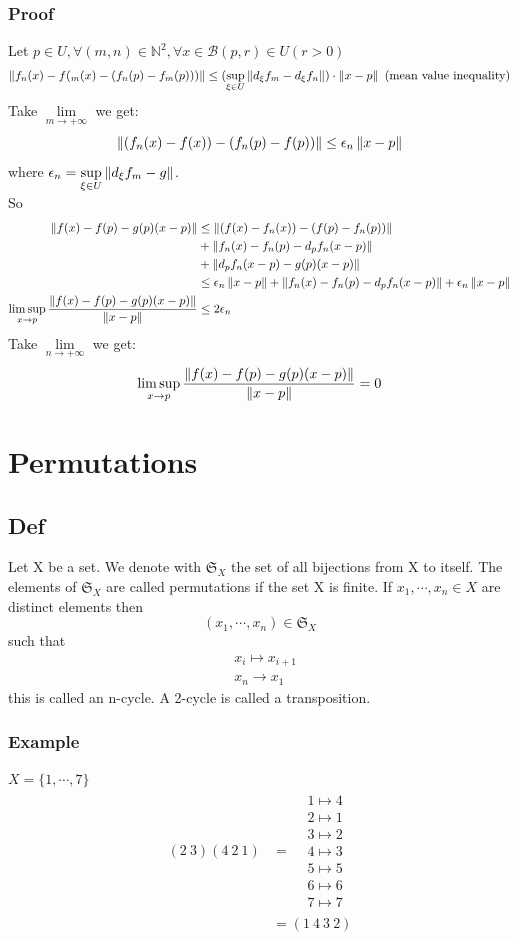 \documentclass{book}
\begin{document}
\subsection*{Proof}
Let $p\in U,\forall(m,n)\in \mathbb{N}^2,\forall x\in \mathcal{B}(p,r)\in U(r>0)$
$$\begin{aligned}
    \left\lVert f_n(x)-f(_m(x)-(f_n(p)-f_m(p))) \right\rVert\leq (\sup\limits_{\xi\in U}\left\lVert d_\xi f_m-d_\xi f_n \right\rVert)\cdot\left\lVert x-p \right\rVert\ (\text{mean value inequality})
\end{aligned}$$
Take $\lim\limits_{m\rightarrow+\infty}$ we get:
$$\left\lVert (f_n(x)-f(x))-(f_n(p)-f(p)) \right\rVert\leq\epsilon_n\left\lVert x-p \right\rVert$$
where $\epsilon_n=\sup\limits_{\xi\in U}\left\lVert d_\xi f_m-g \right\rVert$.\\
So $$\begin{aligned}
    \left\lVert f(x)-f(p)-g(p)(x-p) \right\rVert &\leq\left\lVert (f(x)-f_n(x))-(f(p)-f_n(p)) \right\rVert\\ &+\left\lVert f_n(x)-f_n(p)-d_pf_n(x-p) \right\rVert\\ & +\left\lVert d_p f_n(x-p)-g(p)(x-p) \right\rVert\\
    &\leq\epsilon_n\left\lVert x-p \right\rVert+\left\lVert f_n(x)-f_n(p)-d_pf_n(x-p) \right\rVert+\epsilon_n\left\lVert x-p \right\rVert\\
    \limsup\limits_{x\rightarrow p}\frac{\left\lVert f(x)-f(p)-g(p)(x-p) \right\rVert}{\left\lVert x-p \right\rVert} &\leq 2\epsilon_n
\end{aligned}$$
Take $\lim\limits_{n\rightarrow +\infty}$ we get:
$$\limsup\limits_{x\rightarrow p}\frac{\left\lVert f(x)-f(p)-g(p)(x-p) \right\rVert}{\left\lVert x-p \right\rVert}=0$$
\chapter{Permutations}
\section{Def}
Let X be a set. We denote with $\mathfrak{S}_X$ the set of all bijections from X to itself. The elements of $\mathfrak{S}_X$ are called permutations if the set X is finite. If $x_1,\cdots,x_n\in X$ are distinct elements then
$$(x_1,\cdots,x_n)\in\mathfrak{S}_X$$ such that $$
\begin{aligned}
    &x_i\mapsto x_{i+1}\\
    &x_n\rightarrow x_1
\end{aligned}
$$
this is called an n-cycle. A 2-cycle is called a transposition.
\subsection{Example}
$X=\{1,\cdots,7\}$
$$\begin{aligned}
    (2\ 3)(4\ 2\ 1) &= \begin{aligned}
        &1\mapsto4\\
        &2\mapsto1\\
        &3\mapsto2\\
        &4\mapsto3\\
        &5\mapsto5\\
        &6\mapsto6\\
        &7\mapsto7
    \end{aligned}\\
    &=(1\ 4\ 3\ 2)
\end{aligned}$$
\end{document}
